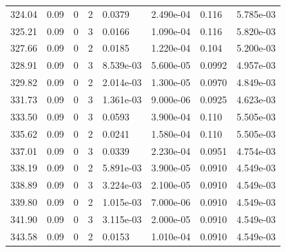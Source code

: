 \documentclass[preview]{standalone}
\begin{document}
{{{{{{\begin{tabular}{L{1.2cm}C{1.2cm} C{0.3cm}C{0.5cm} C{1.4cm}C{1.4cm} C{1.4cm}C{1.4cm}}
  324.04  &  0.09  & 0     &  2 &  0.0379  & 2.490e-04  & 0.116 &  5.785e-03   \\ 
  325.21  &  0.09  & 0     &  3 &  0.0166  & 1.090e-04  & 0.116 &  5.820e-03   \\ 
  327.66  &  0.09  & 0     &  2 &  0.0185  & 1.220e-04  & 0.104 &  5.200e-03   \\ 
  328.91  &  0.09  & 0     &  3 &  8.539e-03  & 5.600e-05  & 0.0992 &  4.957e-03   \\ 
  329.82  &  0.09  & 0     &  2 &  2.014e-03  & 1.300e-05  & 0.0970 &  4.849e-03   \\ 
  331.73  &  0.09  & 0     &  3 &  1.361e-03  & 9.000e-06  & 0.0925 &  4.623e-03   \\ 
  333.50  &  0.09  & 0     &  3 &  0.0593  & 3.900e-04  & 0.110 &  5.505e-03   \\ 
  335.62  &  0.09  & 0     &  2 &  0.0241  & 1.580e-04  & 0.110 &  5.505e-03   \\ 
  337.01  &  0.09  & 0     &  3 &  0.0339  & 2.230e-04  & 0.0951 &  4.754e-03   \\ 
  338.19  &  0.09  & 0     &  2 &  5.891e-03  & 3.900e-05  & 0.0910 &  4.549e-03   \\ 
  338.89  &  0.09  & 0     &  3 &  3.224e-03  & 2.100e-05  & 0.0910 &  4.549e-03   \\ 
  339.80  &  0.09  & 0     &  2 &  1.015e-03  & 7.000e-06  & 0.0910 &  4.549e-03   \\ 
  341.90  &  0.09  & 0     &  3 &  3.115e-03  & 2.000e-05  & 0.0910 &  4.549e-03   \\ 
  343.58  &  0.09  & 0     &  2 &  0.0153  & 1.010e-04  & 0.0910 &  4.549e-03   \\ 
\hline 
\end{tabular} 

}}}}}}
\end{document}

